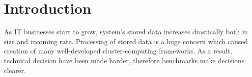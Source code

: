 \documentclass[report.tex]{subfiles}
\begin{document}
\section{Introduction}
As IT businesses start to grow, system's stored data increases drastically both in size and incoming rate. Processing of stored data is a huge concern which caused creation of many well-developed cluster-computing frameworks. As a result, technical decision have been made harder, therefore benchmarks make decisions clearer.
\end{document}

